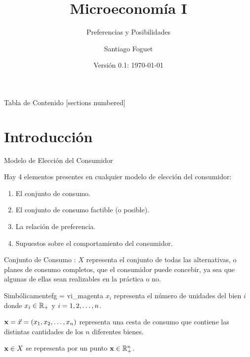 \documentclass[10pt,aspectratio=169]{beamer}  %
\title{Microeconomía I}
\subtitle{Preferencias y Posibilidades}
\date{Versión 0.1: \today}
\author{Santiago Foguet}
\institute{\textbf{Instituto de Investigaciones Económicas} \\ Facultad de Ciencias Económicas \\ Universidad Nacional de Tucumán}
\begin{document}
\maketitle

\begin{frame}{Tabla de Contenido}
  [sections numbered]
  \tableofcontents[hideallsubsections]
\end{frame}


% 
\section{Introducción}


\begin{frame}{Modelo de Elección del Consumidor}

  Hay 4 elementos presentes en cualquier modelo de elección del consumidor:
  
  \begin{enumerate}[label=(\alph*)]
    \item El conjunto de consumo.
    \item El conjunto de consumo factible (o posible).
    \item La relación de preferencia.
    \item Supuestos sobre el comportamiento del consumidor.
\end{enumerate}

\end{frame}


\begin{frame}{Conjunto de Consumo}
	: $X$ representa el conjunto de todas las alternativas, o planes de consumo 
  completos, que el consumidor puede concebir, ya sea que algunas de ellas sean realizables en la práctica o no. 
  \vspace{5pt} \pause
  \begin{varblock}{Simbólicamente}{fg = vi_magenta}
	 $x_i$ representa el número de unidades del bien $i$ donde $x_i \in \mathbb{R}_{+}$ y $i = 1, 2, \dots, n$.
   
   $\mathbf{x} = \vec{x} = (x_1, x_2, \dots, x_n)$ representa una cesta de consumo que contiene las distintas cantidades de los 
   $n$ diferentes bienes.
   
   $\mathbf{x} \in X$ se representa por un punto $\mathbf{x} \in \mathbb{R}^{n}_{+}$.
  \end{varblock}

\end{frame}
 
\end{document}
